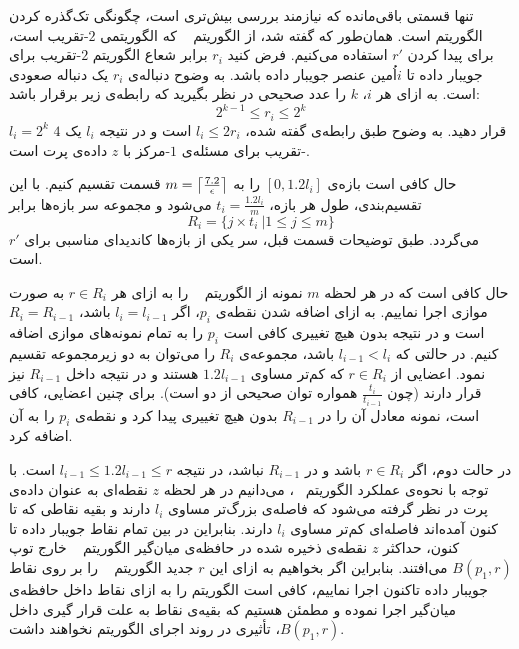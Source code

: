  تنها قسمتی باقی‌مانده که نیازمند بررسی بیش‌تری است، چگونگی تک‌گذره کردن الگوریتم است.
 همان‌طور که گفته شد، از الگوریتم ~ که الگوریتمی $2$-تقریب است، برای پیدا کردن $r'$ استفاده می‌کنیم.
 فرض کنید $r_i$ برابر شعاع الگوریتم $2$-تقریب برای جویبار داده تا $i$اُمین عنصر جویبار داده باشد.
 به وضوح دنباله‌ی $r_i$ یک دنباله صعودی است.
 به ازای هر $i$، $k$ را عدد صحیحی در نظر بگیرید که رابطه‌ی زیر برقرار باشد:
 $$2^{k-1} \leq r_i \leq 2^k$$
 $l_i = 2^k$
قرار دهید. به وضوح طبق رابطه‌ی گفته شده، $l_i \leq 2r_i$ است و در نتیجه $l_i$ یک $4$-تقریب برای مسئله‌ی $1$-مرکز با $z$ داده‌ی پرت است.
 
 حال کافی است بازه‌ی $[0, 1.2l_i]$ را به $m = \left\lceil{\frac{7.2}{\epsilon}}\right\rceil$ قسمت تقسیم کنیم. با این تقسیم‌بندی، طول هر بازه، $t_i = \frac{1.2l_i}{m}$ می‌شود و مجموعه سر بازه‌ها برابر
 $$R_i = \{ j \times t_i \ | 1 \leq j \leq m \}$$
 می‌گردد. طبق توضیحات قسمت قبل، سر یکی از بازه‌ها کاندیدای مناسبی برای $r'$ است. 


 حال کافی است که در هر لحظه $m$ نمونه از الگوریتم ~ را به ازای هر $r \in R_i$ به صورت موازی اجرا نماییم. به ازای اضافه شدن نقطه‌ی $p_i$، اگر $l_i = l_{i-1}$ باشد، $R_i = R_{i-1}$ است و در نتیجه بدون هیچ تغییری کافی است $p_i$ را به تمام نمونه‌های موازی اضافه کنیم.
 در حالتی که $l_{i-1} < l_{i}$ باشد، مجموعه‌ی $R_i$ را می‌توان به دو زیرمجموعه تقسیم نمود.
 اعضایی از $r \in R_i$ که کم‌تر مساوی $1.2l_{i-1}$ هستند و در نتیجه داخل $R_{i-1}$ نیز قرار دارند (چون $\frac{t_i}{t_{i-1}}$ همواره توان صحیحی از دو است).
 برای چنین اعضایی، کافی است، نمونه معادل آن را در $R_{i-1}$ بدون هیچ تغییری پیدا کرد و نقطه‌ی $p_i$ را به آن اضافه کرد.
 
 در حالت دوم، اگر $r \in R_i$ باشد و در $R_{i-1}$ نباشد، در نتیجه $l_{i-1} \leq 1.2l_{i-1} \leq r$ است.
 با توجه با نحوه‌ی عملکرد الگوریتم ~، می‌دانیم در هر لحظه $z$ نقطه‌ای به عنوان داده‌ی پرت در نظر گرفته می‌شود که فاصله‌ی بزرگ‌تر مساوی $l_i$ دارند و بقیه نقاطی که تا کنون آمده‌اند فاصله‌ای کم‌تر مساوی $l_i$ دارند.
 بنابراین در بین تمام نقاط جویبار داده تا کنون، حداکثر $z$ نقطه‌ی ذخیره شده در حافظه‌ی میان‌گیر الگوریتم ~ خارج توپ $B(p_1, r)$ می‌افتند.
 بنابراین اگر بخواهیم به ازای این $r$ جدید الگوریتم ~ را بر روی نقاط جویبار داده تاکنون اجرا نماییم، کافی است الگوریتم را به ازای نقاط داخل حافظه‌ی میان‌گیر اجرا نموده و مطمئن هستیم که بقیه‌ی نقاط به علت قرار گیری داخل $B(p_1, r)$، تأثیری در روند اجرای الگوریتم نخواهند داشت. 
 

